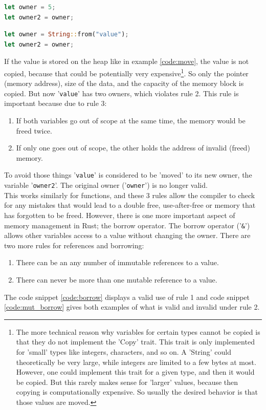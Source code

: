 \begin{minipage}{\textwidth}
\begin{lstlisting}[style=colorEX,language=Rust,caption={Simple example of a copy},label={code:copy}]
let owner = 5;
let owner2 = owner;
\end{lstlisting}
\end{minipage}

\begin{minipage}{\textwidth}
\begin{lstlisting}[style=colorEX,language=Rust,caption={Simple example of a move},label={code:move}]
let owner = String::from("value");
let owner2 = owner;
\end{lstlisting}
\end{minipage}

If the value is stored on the heap like in example \ref{code:move}, the value is not copied, because that could
be potentially very expensive\footnote{The more technical reason why variables for certain types cannot be copied
is that they do not implement the 'Copy' trait. This trait is only implemented for 'small' types like integers,
characters, and so on. A 'String' could theoretically be very large, while integers are limited to a few bytes at most.
However, one could implement this trait for a given type, and then it would be copied.
But this rarely makes sense for 'larger' values, because then copying is computationally expensive.
So usually the desired behavior is that those values are moved.}.
So only the pointer (memory address), size of the data, and the capacity of the memory block is copied.
But now '\lstinline{value}' has two owners, which violates rule 2.
This rule is important because due to rule 3:
\begin{enumerate}
    \item If both variables go out of scope at the same time, the memory would be freed twice.
    \item If only one goes out of scope, the other holds the address of invalid (freed) memory.
\end{enumerate}
To avoid those things '\lstinline{value}' is considered to be 'moved' to its new owner, the variable '\lstinline{owner2}'.
The original owner ('\lstinline{owner}') is no longer valid.\\
This works similarly for functions, and these 3 rules allow the compiler to check for any mistakes that would lead to
a double free, use-after-free or memory that has forgotten to be freed.
However, there is one more important aspect of memory management in Rust; the borrow operator.
The borrow operator ('\lstinline{&}') \cite{rust_borrow} allows other variables access to a value without changing the owner.
There are two more rules for references and borrowing:
\begin{enumerate}
    \item There can be an any number of immutable references to a value.
    \item There can never be more than one mutable reference to a value.
\end{enumerate}
The code snippet \ref{code:borrow} displays a valid use of rule 1 and code snippet \ref{code:mut_borrow} gives both examples
of what is valid and invalid under rule 2.

